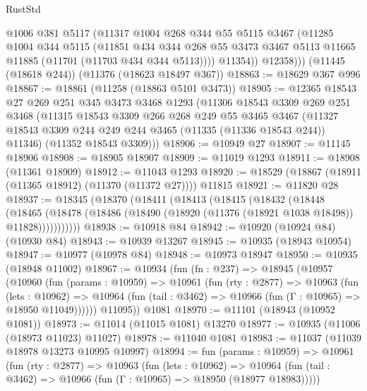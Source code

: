 \begin{lexlean}{RustStd}
\begin{coremodule}
{\begin{coremodule}
{{{{{{{{{{{{{{{{{{{{{{{{{{{{{{{{{{{{{{{{{{{{{{{{{{{{{{{{{{{{{{{{{{{{{{{{{{{{{{{{{{{{{            @1006
            @381
            @5117
            (@11317
              @1004
              @268
              @344
              @55
              @5115
              @3467
              (@11285
                @1004
                @344
                @5115
                (@11851
                  @434
                  @344
                  @268
                  @55
                  @3473
                  @3467
                  @5113
                  @11665
                  @11885
                  (@11701 (@11703 @434 @344 @5113))))
              @11354))
          @12358)))
    (@11445 (@18618 @244))
    (@11376 (@18623 @18497 @367))
@18863 := @18629 @367 @996
@18867 := @18861 (@11258 (@18863 @5101 @3473))
@18905 := @12365
    @18543
    @27
    @269
    @251
    @345
    @3473
    @3468
    @1293
    (@11306
      @18543
      @3309
      @269
      @251
      @3468
      (@11315
        @18543
        @3309
        @266
        @268
        @249
        @55
        @3465
        @3467
        (@11327 @18543 @3309 @244 @249 @244 @3465 (@11335 (@11336 @18543 @244)) @11346)
        (@11352 @18543 @3309)))
@18906 := @10949 @27
@18907 := @11145 @18906
@18908 := @18905 @18907
@18909 := @11019 @1293
@18911 := @18908 (@11361 @18909)
@18912 := @11043 @1293
@18920 := @18529 (@18867 (@18911 (@11365 @18912) (@11370 (@11372 @27)))) @11815
@18921 := @11820 @28
@18937 := @18345
    (@18370
      (@18411
        (@18413
          (@18415
            (@18432
              (@18448
                (@18465
                  (@18478 (@18486 (@18490 (@18920 (@11376 (@18921 @1038 @18498)) @11828)))))))))))
@18938 := @10918 @84
@18942 := @10920 (@10924 @84) (@10930 @84)
@18943 := @10939 @13267
@18945 := @10935 (@18943 @10954)
@18947 := @10977 (@10978 @84)
@18948 := @10973 @18947
@18950 := @10935 (@18948 @11002)
@18967 := @10934
    (fun (fn : @237) =>
    @18945
      (@10957
        (@10960
          (fun (params : @10959) =>
          @10961
            (fun (rty : @2877) =>
            @10963
              (fun (lets : @10962) =>
              @10964 (fun (tail : @3462) => @10966 (fun (Γ : @10965) => @18950 @11049))))))
        @11095))
    @1081
@18970 := @11101 (@18943 (@10952 @1081))
@18973 := @11014 (@11015 @1081) @13270
@18977 := @10935 (@11006 (@18973 @11023) @11027)
@18978 := @11040 @1081
@18983 := @11037 (@11039 @18978 @13273 @10995 @10997)
@18994 := fun (params : @10959) =>
  @10961
    (fun (rty : @2877) =>
    @10963
      (fun (lets : @10962) =>
      @10964 (fun (tail : @3462) => @10966 (fun (Γ : @10965) => @18950 (@18977 @18983)))))
}}}}}}}}}}}}}}}}}}}}}}}}}}}}}}}}}}}}}}}}}}}}}}}}}}}}}}}}}}}}}}}}}}}}}}}}}}}}}}}}}}}}}
\end{coremodule}}
\end{coremodule}
\end{lexlean}
